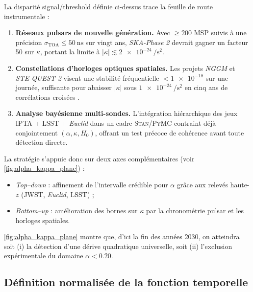 \documentclass[11pt]{article}
\begin{document}
La disparité signal/thres\-hold définie ci-dessus trace la feuille de route
instrumentale :

\begin{enumerate}[label=\alph*)]
  \item \textbf{Réseaux pulsars de nouvelle génération.}  
        Avec $\ge 200$ MSP suivis à une précision
        $\sigma_{\text{TOA}}\le\SI{50}{\nano\second}$ sur vingt ans,
        \textit{SKA-Phase 2} devrait gagner un facteur 50 sur \(\kappa\),
        portant la limite à
        \(\lvert\kappa\rvert\lesssim
        \SI{2e-24}{\per\square\second}\).

  \item \textbf{Constellations d’horloges optiques spatiales.}  
        Les projets \textit{NGGM} et \textit{STE-QUEST 2}
        visent une stabilité fréquentielle
        \(<\num{1e-18}\) sur une journée,
        suffisante pour abaisser
        \(\lvert\kappa\rvert\) sous
        \(\SI{1e-24}{\per\square\second}\)
        en cinq ans de corrélations croisées
        \parencite{NgGM2024}.

  \item \textbf{Analyse bayésienne multi-sondes.}  
        L’intégration hiérarchique des jeux
        IPTA + LSST + \textit{Euclid}
        dans un cadre \textsc{Stan}/\textsc{PyMC}
        contraint déjà conjointement
        \((\alpha,\kappa,H_{0})\),
        offrant un test précoce de cohérence
        avant toute détection directe.
\end{enumerate}

La stratégie s’appuie donc sur deux axes complémentaires
(voir \autoref{fig:alpha_kappa_plane}) :

\begin{itemize}
  \item \emph{Top–down} : affinement de l’intervalle crédible
        pour \(\alpha\) grâce aux relevés haute-\(z\)
        (JWST, \textit{Euclid}, LSST) ;
  \item \emph{Bottom–up} : amélioration des bornes sur
        \(\kappa\) par la chronométrie pulsar et les horloges spatiales.
\end{itemize}

\autoref{fig:alpha_kappa_plane} montre que, d’ici la fin des années 2030,
on atteindra soit (i) la détection d’une dérive quadratique universelle,
soit (ii) l’exclusion expérimentale du domaine \(\alpha<0.20\).

\subsection{Définition normalisée de la fonction temporelle}
\end{document}
